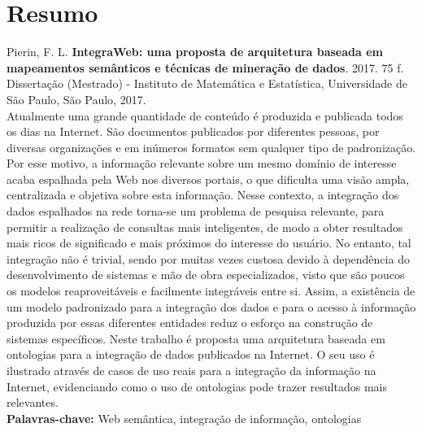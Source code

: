 \documentclass[11pt,twoside,a4paper]{book}
\begin{document}
\chapter*{Resumo}

\noindent Pierin, F. L. \textbf{IntegraWeb: uma proposta de arquitetura baseada em mapeamentos semânticos e técnicas de mineração de dados}. 
2017. 75 f.
Dissertação (Mestrado) - Instituto de Matemática e Estatística,
Universidade de São Paulo, São Paulo, 2017.
\\

Atualmente uma grande quantidade de conteúdo é produzida e publicada
todos os dias na Internet. São documentos publicados por diferentes
pessoas, por diversas organizações e em inúmeros formatos sem qualquer
tipo de padronização. Por esse motivo, a informação relevante sobre um
mesmo domínio de interesse acaba espalhada pela Web nos diversos
portais, o que dificulta uma visão ampla, centralizada e objetiva
sobre esta informação. Nesse contexto, a integração dos dados
espalhados na rede torna-se um problema de pesquisa relevante, para
permitir a realização de consultas mais inteligentes, de modo a obter
resultados mais ricos de significado e mais próximos do interesse do
usuário. No entanto, tal integração não é trivial, sendo por muitas
vezes custosa devido à dependência do desenvolvimento de sistemas e
mão de obra especializados, visto que são poucos os modelos
reaproveitáveis e facilmente integráveis entre si. Assim, a existência
de um modelo padronizado para a integração dos dados e para o acesso à
informação produzida por essas diferentes entidades reduz o esforço na
construção de sistemas específicos. Neste trabalho é proposta uma
arquitetura baseada em ontologias para a integração de dados publicados na Internet. O seu uso é ilustrado através de casos de uso reais para a integração da informação na Internet, evidenciando  como o uso de ontologias pode trazer resultados mais relevantes. 
\\

\noindent \textbf{Palavras-chave:} Web semântica, integração de informação, ontologias
\end{document}
